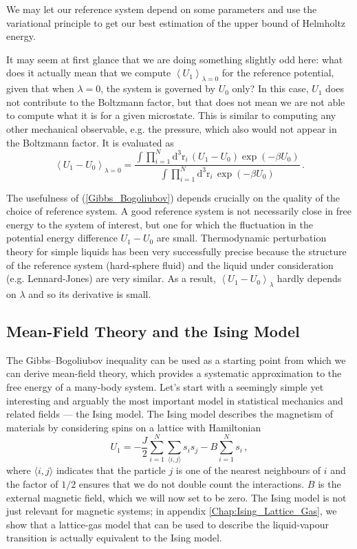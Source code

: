 \documentclass{article}
\theoremstyle{plain}\theoremheaderfont{\normalfont\bfseries}\theorembodyfont{\rmfamily}\theoremseparator{.}\newtheorem*{thm}{Theorem}\newtheorem*{law}{Law}\newtheorem*{pos}{Postulate}
\numberwithin{equation}{section}
\newcommand{\dd}[2][]{\mathrm{d}^{#1} #2\,}
\newcommand{\eval}[1]{\left\langle #1 \right\rangle}
\newcommand{\vb}[1]{\bm{\mathrm{#1}}}
\begin{document}
    We may let our reference system depend on some parameters and use the variational principle to get our best estimation of the upper bound of Helmholtz energy.

    It may seem at first glance that we are doing something slightly odd here: what does it actually mean that we compute \(\eval{U_1}_{\lambda=0}\) for the reference potential, given that when \(\lambda=0\), the system is governed by \(U_0\) only? In this case, \(U_1\) does not contribute to the Boltzmann factor, but that does not mean we are not able to compute what it is for a given microstate. This is similar to computing any other mechanical observable, e.g. the pressure, which also would not appear in the Boltzmann factor. It is evaluated as
    \begin{equation}
        \eval{U_1-U_0}_{\lambda=0}=\frac{\int\prod_{i=1}^{N}\dd[3]{\vb{r}_i}(U_1-U_0)\exp(-\beta U_0)}{\int\prod_{i=1}^{N}\dd[3]{\vb{r}_i}\exp(-\beta U_0)}\,.
    \end{equation}

    The usefulness of (\ref{Gibbs_Bogoliubov}) depends crucially on the quality of the choice of reference system. A good reference system is not necessarily close in free energy to the system of interest, but one for which the fluctuation in the potential energy difference \(U_1-U_0\) are small. Thermodynamic perturbation theory for simple liquids has been very successfully precise because the structure of the reference system (hard-sphere fluid) and the liquid under consideration (e.g. Lennard-Jones) are very similar. As a result, \(\eval{U_1-U_0}_{\lambda}\) hardly depends on \(\lambda\) and so its derivative is small.

    \subsection{Mean-Field Theory and the Ising Model}
    The Gibbs--Bogoliubov inequality can be used as a starting point from which we can derive mean-field theory, which provides a systematic approximation to the free energy of a many-body system. Let's start with a seemingly simple yet interesting and arguably the most important model in statistical mechanics and related fields --- the Ising model. The Ising model describes the magnetism of materials by considering spins on a lattice with Hamiltonian
    \begin{equation}
        U_1=-\frac{J}{2}\sum_{i=1}^{N}\sum_{\langle i,j\rangle}s_is_j-B\sum_{i=1}^{N}s_i\,,
    \end{equation}
    where \(\langle i,j\rangle\) indicates that the particle \(j\) is one of the nearest neighbours of \(i\) and the factor of \(1/2\) ensures that we do not double count the interactions. \(B\) is the external magnetic field, which we will now set to be zero. The Ising model is not just relevant for magnetic systems; in appendix \cref{Chap:Ising_Lattice_Gas}, we show that a lattice-gas model that can be used to describe the liquid-vapour transition is actually equivalent to the Ising model.
\end{document}

